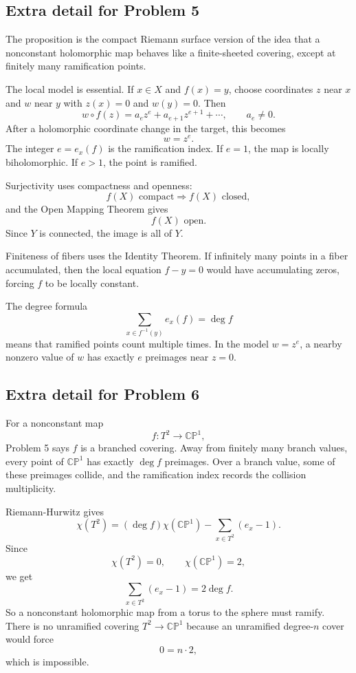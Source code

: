 \documentclass[11pt]{article}
\newcommand{\CP}{\mathbb{CP}}
\begin{document}
\subsection*{Extra detail for Problem 5}

The proposition is the compact Riemann surface version of the idea that a nonconstant holomorphic map behaves like a finite-sheeted covering, except at finitely many ramification points.

The local model is essential. If $x\in X$ and $f(x)=y$, choose coordinates $z$ near $x$ and $w$ near $y$ with $z(x)=0$ and $w(y)=0$. Then
\[
 w\circ f(z)=a_ez^e+a_{e+1}z^{e+1}+\cdots,\qquad a_e\neq0.
\]
After a holomorphic coordinate change in the target, this becomes
\[
 w=z^e.
\]
The integer $e=e_x(f)$ is the ramification index. If $e=1$, the map is locally biholomorphic. If $e>1$, the point is ramified.

Surjectivity uses compactness and openness:
\[
 f(X)\text{ compact}\Rightarrow f(X)\text{ closed},
\]
and the Open Mapping Theorem gives
\[
 f(X)\text{ open}.
\]
Since $Y$ is connected, the image is all of $Y$.

Finiteness of fibers uses the Identity Theorem. If infinitely many points in a fiber accumulated, then the local equation $f-y=0$ would have accumulating zeros, forcing $f$ to be locally constant.

The degree formula
\[
 \sum_{x\in f^{-1}(y)}e_x(f)=\deg f
\]
means that ramified points count multiple times. In the model $w=z^e$, a nearby nonzero value of $w$ has exactly $e$ preimages near $z=0$.

\subsection*{Extra detail for Problem 6}

For a nonconstant map
\[
 f:T^2\to\CP^1,
\]
Problem 5 says $f$ is a branched covering. Away from finitely many branch values, every point of $\CP^1$ has exactly $\deg f$ preimages. Over a branch value, some of these preimages collide, and the ramification index records the collision multiplicity.

Riemann-Hurwitz gives
\[
 \chi(T^2)=(\deg f)\chi(\CP^1)-\sum_{x\in T^2}(e_x-1).
\]
Since
\[
 \chi(T^2)=0,\qquad \chi(\CP^1)=2,
\]
we get
\[
 \sum_{x\in T^2}(e_x-1)=2\deg f.
\]
So a nonconstant holomorphic map from a torus to the sphere must ramify. There is no unramified covering $T^2\to\CP^1$ because an unramified degree-$n$ cover would force
\[
 0=n\cdot2,
\]
which is impossible.
\end{document}
